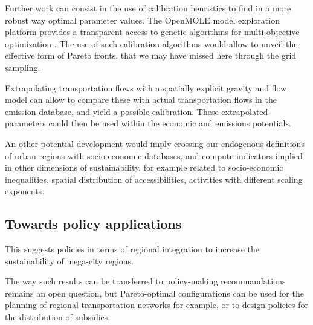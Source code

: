 \documentclass{jimis-en}
\begin{document}
Further work can consist in the use of calibration heuristics to find in a more robust way optimal parameter values. The OpenMOLE model exploration platform provides a transparent access to genetic algorithms for multi-objective optimization \citep{reuillon2013openmole}. The use of such calibration algorithms would allow to unveil the effective form of Pareto fronts, that we may have missed here through the grid sampling.













Extrapolating transportation flows with a spatially explicit gravity and flow model can allow to compare these with actual transportation flows in the emission database, and yield a possible calibration. These extrapolated parameters could then be used within the economic and emissions potentials.

An other potential development would imply crossing our endogenous definitions of urban regions with socio-economic databases, and compute indicators implied in other dimensions of sustainability, for example related to socio-economic inequalities, spatial distribution of accessibilities, activities with different scaling exponents.



\subsection{Towards policy applications}


This suggests policies in terms of regional integration to increase the sustainability of mega-city regions.

The way such results can be transferred to policy-making recommandations remains an open question, but Pareto-optimal configurations can be used for the planning of regional transportation networks for example, or to design policies for the distribution of subsidies.
\end{document}

